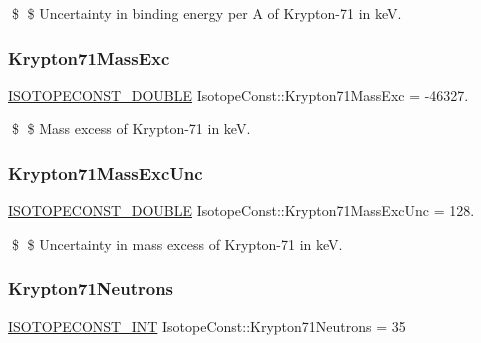 \$ \$ Uncertainty in binding energy per A of Krypton-\/71 in keV. \mbox{\label{group___isotope_const-_krypton-_kr71_ga016f9015ef9428b820e383831f041ac7}} 
\subsubsection{\texorpdfstring{Krypton71\+Mass\+Exc}{Krypton71MassExc}}
{\footnotesize\ttfamily \mbox{\hyperlink{group___isotope_const-_macros_ga8f45a7272ce02c0b4c65c44636ed719a}{I\+S\+O\+T\+O\+P\+E\+C\+O\+N\+S\+T\+\_\+\+D\+O\+U\+B\+LE}} Isotope\+Const\+::\+Krypton71\+Mass\+Exc = -\/46327.}

\$ \$ Mass excess of Krypton-\/71 in keV. \mbox{\label{group___isotope_const-_krypton-_kr71_gacfe783f62e836321aa2eca4a282f6f05}} 
\subsubsection{\texorpdfstring{Krypton71\+Mass\+Exc\+Unc}{Krypton71MassExcUnc}}
{\footnotesize\ttfamily \mbox{\hyperlink{group___isotope_const-_macros_ga8f45a7272ce02c0b4c65c44636ed719a}{I\+S\+O\+T\+O\+P\+E\+C\+O\+N\+S\+T\+\_\+\+D\+O\+U\+B\+LE}} Isotope\+Const\+::\+Krypton71\+Mass\+Exc\+Unc = 128.}

\$ \$ Uncertainty in mass excess of Krypton-\/71 in keV. \mbox{\label{group___isotope_const-_krypton-_kr71_ga775455ed6ff17e0fe8b4921403391b10}} 
\subsubsection{\texorpdfstring{Krypton71\+Neutrons}{Krypton71Neutrons}}
{\footnotesize\ttfamily \mbox{\hyperlink{group___isotope_const-_macros_ga5f18360b3e99483a35c32d789e62621c}{I\+S\+O\+T\+O\+P\+E\+C\+O\+N\+S\+T\+\_\+\+I\+NT}} Isotope\+Const\+::\+Krypton71\+Neutrons = 35}

